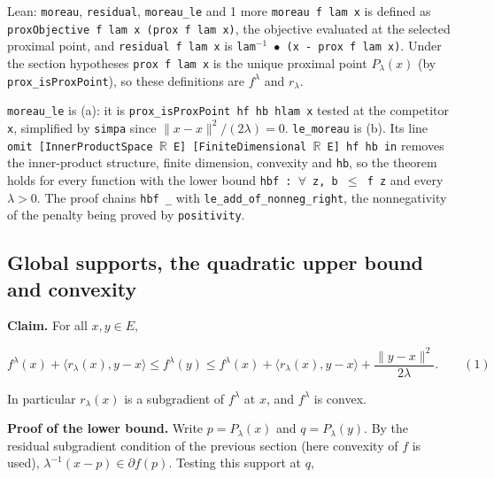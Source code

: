 \documentclass[11pt,a4paper]{report}
\begin{document}
\begin{leanbox}{Lean: \texttt{moreau}, \texttt{residual}, \texttt{moreau\_\allowbreak{}le} and 1 more}
\texttt{moreau f lam x} is defined as \texttt{prox\allowbreak{}Objective f lam x (prox f lam x)}, the objective evaluated at the selected proximal point, and \texttt{residual f lam x} is \texttt{lam\ensuremath{{}^{-1}} \ensuremath{\bullet} (x -\allowbreak{} prox f lam x)}. Under the section hypotheses \texttt{prox f lam x} is the unique proximal point \(P_\lambda(x)\) (by \texttt{prox\_\allowbreak{}is\allowbreak{}Prox\allowbreak{}Point}), so these definitions are \(f^\lambda\) and \(r_\lambda\).




\texttt{moreau\_\allowbreak{}le} is (a): it is \texttt{prox\_\allowbreak{}is\allowbreak{}Prox\allowbreak{}Point hf hb hlam x} tested at the competitor \texttt{x}, simplified by \texttt{simpa} since \(\|x-x\|^2/(2\lambda)=0\). \texttt{le\_\allowbreak{}moreau} is (b). Its line \texttt{omit [Inner\allowbreak{}Product\allowbreak{}Space \ensuremath{\mathbb R} E] [Finite\allowbreak{}Dimensional \ensuremath{\mathbb R} E] hf hb in} removes the inner-product structure, finite dimension, convexity and \texttt{hb}, so the theorem holds for every function with the lower bound \texttt{hbf : \ensuremath{\forall} z, b \ensuremath{\le} f z} and every \(\lambda>0\). The proof chains \texttt{hbf \_\allowbreak{}} with \texttt{le\_\allowbreak{}add\_\allowbreak{}of\_\allowbreak{}nonneg\_\allowbreak{}right}, the nonnegativity of the penalty being proved by \texttt{positivity}.
\end{leanbox}
\subsection{\texorpdfstring{Global supports, the quadratic upper bound and convexity}{Global supports, the quadratic upper bound and convexity}}
\label{report-step-ProximalLangevin-Moreau-lean-2}


\textbf{Claim.} For all \(x,y\in E\),


\[f^\lambda(x)+\langle r_\lambda(x),y-x\rangle\le f^\lambda(y)\le f^\lambda(x)+\langle r_\lambda(x),y-x\rangle+\frac{\|y-x\|^2}{2\lambda}.\qquad(1)\]


In particular \(r_\lambda(x)\) is a subgradient of \(f^\lambda\) at \(x\), and \(f^\lambda\) is convex.




\textbf{Proof of the lower bound.} Write \(p=P_\lambda(x)\) and \(q=P_\lambda(y)\). By the residual subgradient condition of the previous section (here convexity of \(f\) is used), \(\lambda^{-1}(x-p)\in\partial f(p)\). Testing this support at \(q\),
\end{document}
